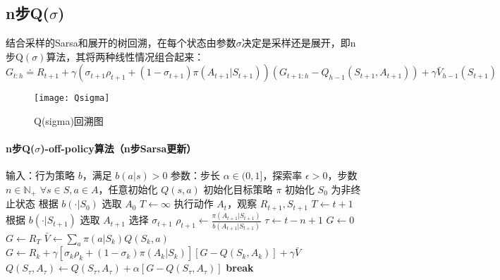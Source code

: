 \documentclass[
12pt, %
a4paper, 
oneside, %
headinclude,footinclude, %
]{scrartcl}
\begin{document}
\subsection{n步Q($ \sigma $)}
结合采样的Sarsa和展开的树回溯，在每个状态由参数$ \sigma $决定是采样还是展开，即n步Q$ (\sigma) $算法，其将两种线性情况组合起来：
$$ G_{t:h} \doteq R_{t + 1} + \gamma (\sigma_{t + 1} \rho_{t + 1} + (1 - \sigma_{t + 1}) \pi(A_{t + 1}|S_{t + 1}))(G_{t + 1:h} - Q_{h - 1}(S_{t + 1}, A_{t + 1})) + \gamma \bar{V}_{h - 1}(S_{t + 1}) $$

\begin{figure}[H]
\centering
\texttt{[image: Qsigma]}
\caption[Q(sigma)回溯图]{Q(sigma)回溯图}
\end{figure}
\paragraph{n步Q($ \sigma $)-off-policy算法（n步Sarsa更新）}
\begin{myalgorithm}
\State 输入：行为策略 $b$，满足 $b(a|s) > 0$
\State 参数：步长 $\alpha \in (0,1]$，探索率 $\epsilon > 0$，步数 $n \in \mathbb{N}_+$
\State $\forall s \in S, a \in A$，任意初始化 $Q(s, a)$
\State 初始化目标策略 $\pi$
    \State 初始化 $S_0$ 为非终止状态
    \State 根据 $b(\cdot|S_0)$ 选取 $A_0$
    \State $T \gets \infty$
            \State 执行动作 $A_t$，观察 $R_{t+1}, S_{t+1}$
                \State $T \gets t+1$
            \Else
                \State 根据 $b(\cdot|S_{t+1})$ 选取 $A_{t+1}$
                \State 选择 $\sigma_{t+1}$ 
                \State $\rho_{t+1} \gets \frac{\pi(A_{t+1}|S_{t+1})}{b(A_{t+1}|S_{t+1})}$ 
            \EndIf
        \EndIf
        \State $\tau \gets t-n+1$ 
            \State $G \gets 0$
                    \State $G \gets R_T$
                \Else
                    \State $\bar{V} \gets \sum_a \pi(a|S_k)Q(S_k,a)$ 
                    \State $G \gets R_k + \gamma[\sigma_k \rho_k + (1 - \sigma_k)\pi(A_k|S_k)][G - Q(S_k,A_k)] + \gamma\bar{V}$
                \EndIf
            \EndFor
            \State $Q(S_{\tau},A_{\tau}) \gets Q(S_{\tau},A_{\tau}) + \alpha[G - Q(S_{\tau},A_{\tau})]$
        \EndIf
            \State \textbf{break} 
        \EndIf
    \EndFor
\EndFor
\end{myalgorithm}
\end{document}
